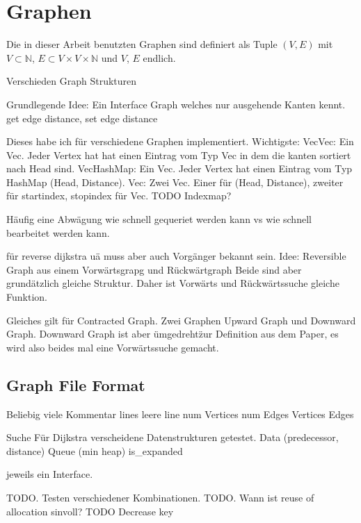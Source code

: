 \chapter{Graphen}

Die in dieser Arbeit benutzten Graphen sind definiert als Tuple $(V, E)$ mit $V \subset \mathbb{N}$, $E \subset V \times V \times \mathbb{N}$ und $V$, $E$ endlich.


Verschieden Graph Strukturen

Grundlegende Idee:
Ein Interface Graph welches nur ausgehende Kanten kennt.
get edge distance, set edge distance

Dieses habe ich für verschiedene Graphen implementiert.
Wichtigste:
VecVec: Ein Vec. Jeder Vertex hat hat einen Eintrag vom Typ Vec in dem die kanten sortiert nach Head sind.
VecHashMap: Ein Vec. Jeder Vertex hat einen Eintrag vom Typ HashMap (Head, Distance).
Vec: Zwei Vec. Einer für (Head, Distance), zweiter für startindex, stopindex für Vec.
TODO Indexmap?

Häufig eine Abwägung wie schnell gequeriet werden kann vs wie schnell bearbeitet werden kann.


für reverse dijkstra uä muss aber auch Vorgänger bekannt sein.
Idee: Reversible Graph aus einem Vorwärtsgrapg und Rückwärtgraph
Beide sind aber grundätzlich gleiche Struktur. Daher ist Vorwärts und Rückwärtssuche gleiche Funktion.


Gleiches gilt für Contracted Graph. Zwei Graphen Upward Graph und Downward Graph. Downward Graph ist aber \"umgedreht\" zur Definition aus dem Paper, es wird also beides mal eine Vorwärtssuche gemacht.


\section{Graph File Format}
Beliebig viele Kommentar lines
leere line
num Vertices
num Edges
Vertices
Edges

Suche
Für Dijkstra verscheidene Datenstrukturen getestet.
Data (predecessor, distance)
Queue (min heap)
is\_expanded

jeweils ein Interface.

TODO. Testen verschiedener Kombinationen.
TODO. Wann ist reuse of allocation sinvoll?
TODO Decrease key

